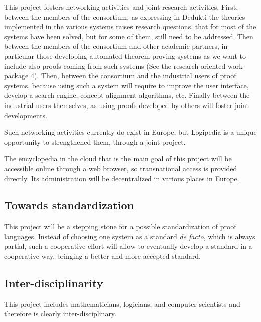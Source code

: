 This project fosters networking activities and joint research
activities. First, between the members of the consortium, as
expressing in {\sc Dedukti} the theories implemented in the various
systems raises research questions, that for most of the systems have
been solved, but for some of them, still need to be addressed.  Then
between the members of the consortium and other academic partners, in
particular those developing automated theorem proving systems as we
want to include also proofs coming from such systems (See the research
oriented work package 4). Then, between the consortium and the
industrial users of proof systems, because using such a system will
require to improve the user interface, develop a search engine,
concept alignment algorithms, etc.  Finally between the industrial
users themselves, as using proofs developed by others will foster joint
developments.

Such networking activities currently do exist in Europe, but {\sc
  Logipedia} is a unique opportunity to strengthened them, through a
joint project.

The encyclopedia in the cloud that is the main goal of this project
will be accessible online through a web browser, so transnational
access is provided directly. Its administration will be decentralized
in various places in Europe.

\subsection{Towards standardization}
This project will be a stepping stone for a possible standardization
of proof languages. Instead of choosing one system as a standard {\em
de facto}, which is always partial, such a cooperative effort will
allow to eventually develop a standard in a cooperative way, bringing
a better and more accepted standard.

\subsection{Inter-disciplinarity}
This project includes mathematicians, logicians, and computer
scientists and therefore is clearly inter-disciplinary.

 











